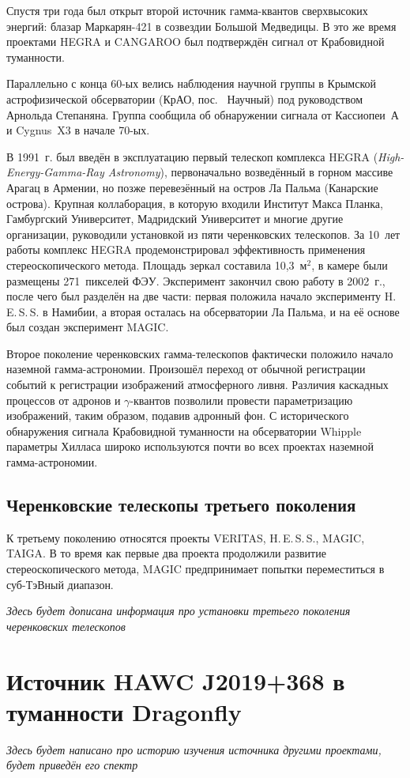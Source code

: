 \documentclass[magd,floatypics,numeref]{msudipl} %
\begin{document}
Спустя три года был открыт второй источник гамма-квантов сверхвысоких энергий: блазар Маркарян-421 в созвездии Большой Медведицы. В это же время проектами HEGRA и CANGAROO был подтверждён сигнал от Крабовидной туманности.

Параллельно с конца 60-ых велись наблюдения научной группы в Крымской астрофизической обсерватории (КрАО, пос.~ Научный) под руководством Арнольда Степаняна.  Группа сообщила об обнаружении сигнала от Кассиопеи~А и Cygnus~X3 в начале 70-ых. 

В 1991~г. был введён в эксплуатацию первый телескоп комплекса HEGRA (\textit{High-Energy-Gamma-Ray Astronomy}), первоначально возведённый в горном массиве Арагац в Армении, но позже перевезённый на остров Ла Пальма (Канарские острова). Крупная коллаборация, в которую входили Институт Макса Планка, Гамбургский Университет, Мадридский Университет и многие другие организации, руководили установкой из пяти черенковских телескопов. За 10~лет работы комплекс HEGRA продемонстрировал эффективность применения стереоскопического метода. Площадь зеркал составила 10,3~$\text{м}^2$, в камере были размещены 271~пикселей ФЭУ. Эксперимент закончил свою работу в 2002~г., после чего был разделён на две части: первая положила начало эксперименту H.\,E.\,S.\,S. в Намибии, а вторая осталась на обсерватории Ла Пальма, и на её основе был создан эксперимент MAGIC. 

Второе поколение черенковских гамма-телескопов фактически положило начало наземной гамма-астрономии. Произошёл переход от обычной регистрации событий к регистрации изображений атмосферного ливня. Различия каскадных процессов от адронов и $\gamma$-квантов позволили провести параметризацию изображений, таким образом, подавив адронный фон. С исторического обнаружения сигнала Крабовидной туманности на обсерватории Whipple параметры Хилласа широко используются почти во всех проектах наземной гамма-астрономии.
\subsection{Черенковские телескопы третьего поколения}
К третьему поколению относятся проекты VERITAS, H.\,E.\,S.\,S., MAGIC, TAIGA. В то время как первые два проекта продолжили развитие стереоскопического метода, MAGIC предпринимает попытки переместиться в суб-ТэВный диапазон. 

\textit{Здесь будет дописана информация про установки третьего поколения черенковских телескопов}
\section{Источник HAWC J2019+368 в туманности Dragonfly}
\textit{Здесь будет написано про историю изучения источника другими проектами, будет приведён его спектр}
\end{document}
